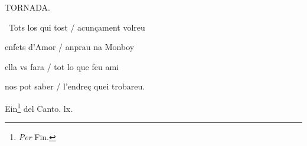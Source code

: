 \documentclass[12pt]{article}
\begin{document}
\begin{estrofaExtra}%




\begin{tornada}

TORNADA.

\end{tornada}


\end{estrofaExtra}


\begin{estrofa}

 \textparagraph\  Tots los qui tost / acun\c{c}ament volreu

 enfets d'Amor / anprau na Monboy

 ella vs fara / tot lo que feu ami

 nos pot saber / l'endre\c{c} quei trobareu.

\end{estrofa}



\begin{estrofaExtra}%

\begin{final}

Ein\footnote{\textit{Per} Fin.} del Canto. lx.

\end{final}

\end{estrofaExtra}
\end{document}
